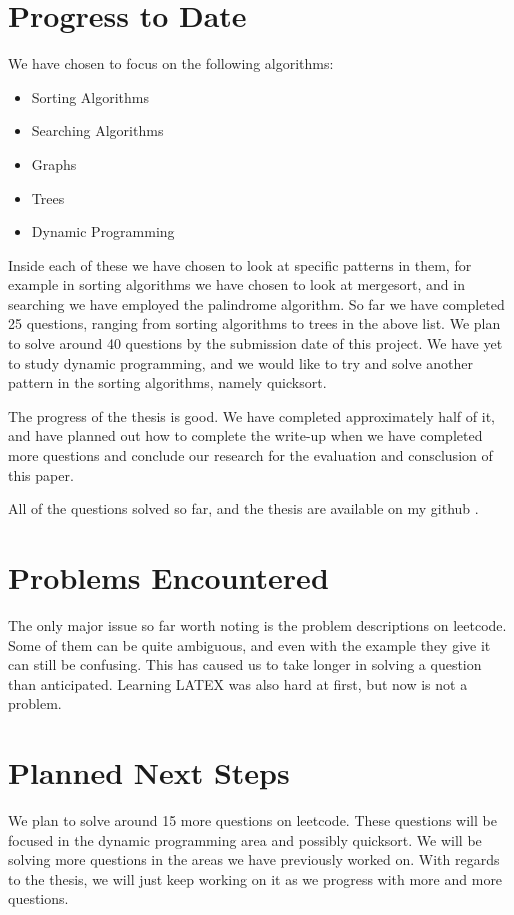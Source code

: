 \documentclass{article}
\begin{document}
\section{Progress to Date}
We have chosen to focus on the following algorithms:
\begin{itemize}
\item Sorting Algorithms
\item Searching Algorithms
\item Graphs
\item Trees
\item Dynamic Programming
\end{itemize}
Inside each of these we have chosen to look at specific patterns in them, for example in sorting algorithms we have chosen to look at mergesort, and in searching we have employed the palindrome algorithm. 
So far we have completed 25 questions, ranging from sorting algorithms to trees in the above list. We plan to solve around 40 questions by the submission date of this project. We have yet to study dynamic programming, and we would like to try and solve another pattern in the sorting algorithms, namely quicksort. 
\par The progress of the thesis is good. We have completed approximately half of it, and have planned out how to complete the write-up when we have completed more questions and conclude our research for the evaluation and consclusion of this paper.
\par All of the questions solved so far, and the thesis are available on my github \cite{gitHub}.  
\section{Problems Encountered}
The only major issue so far worth noting is the problem descriptions on leetcode. Some of them can be quite ambiguous, and even with the example they give it can still be confusing. This has caused us to take longer in solving a question than anticipated. 
Learning LATEX was also hard at first, but now is not a problem.
  
\section{Planned Next Steps}
We plan to solve around 15 more questions on leetcode. These questions will be focused in the dynamic programming area and possibly quicksort. We will be solving more questions in the areas we have previously worked on. 
With regards to the thesis, we will just keep working on it as we progress with more and more questions. 



\end{document}
